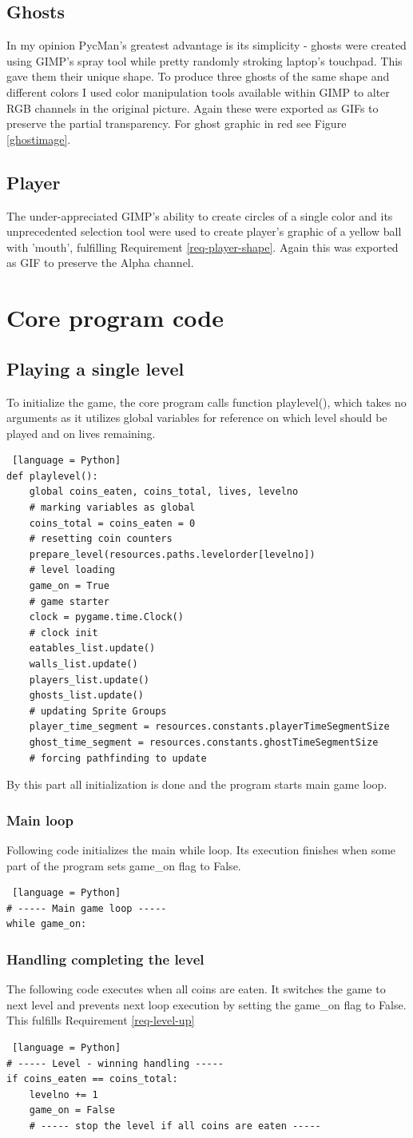 \documentclass[11pt,a4paper]{report}
\newcommand{\dsubsection}[1]{\FloatBarrier \subsection{#1}}
\begin{document}
			\dsubsection{Ghosts}
				In my opinion PycMan's greatest advantage is its simplicity - ghosts were created using GIMP's spray tool while pretty randomly stroking laptop's touchpad. This gave them their unique shape. To produce three ghosts of the same shape and different colors I used color manipulation tools available within GIMP to alter RGB channels in the original picture. Again these were exported as GIFs to preserve the partial transparency. For ghost graphic in red see Figure \ref{ghostimage}.
			\dsubsection{Player}
				The under-appreciated GIMP's ability to create circles of a single color and its unprecedented selection tool were used to create player's graphic of a yellow ball with 'mouth', fulfilling Requirement \ref{req-player-shape}. Again this was exported as GIF to preserve the Alpha channel.
		\section{Core program code}
			\dsubsection{Playing a single level}
				To initialize the game, the core program calls function playlevel(), which takes no arguments as it utilizes global variables for reference on which level should be played and on lives remaining.
				\begin{lstlisting} [language = Python]
def playlevel():
	global coins_eaten, coins_total, lives, levelno
	# marking variables as global
	coins_total = coins_eaten = 0
	# resetting coin counters
	prepare_level(resources.paths.levelorder[levelno])
	# level loading
	game_on = True
	# game starter
	clock = pygame.time.Clock()
	# clock init
	eatables_list.update()
	walls_list.update()
	players_list.update()
	ghosts_list.update()
	# updating Sprite Groups
	player_time_segment = resources.constants.playerTimeSegmentSize
	ghost_time_segment = resources.constants.ghostTimeSegmentSize
	# forcing pathfinding to update
				\end{lstlisting}
				By this part all initialization is done and the program starts main game loop.
				\subsubsection{Main loop}
					Following code initializes the main while loop. Its execution finishes when some part of the program sets game\_on flag to False.
					\begin{lstlisting} [language = Python]
# ----- Main game loop -----
while game_on:
					\end{lstlisting}
				\subsubsection{Handling completing the level}
					The following code executes when all coins are eaten. It switches the game to next level and prevents next loop execution by setting the game\_on flag to False. This fulfills Requirement \ref{req-level-up}
					\begin{lstlisting} [language = Python]
# ----- Level - winning handling -----
if coins_eaten == coins_total:
	levelno += 1
	game_on = False
	# ----- stop the level if all coins are eaten -----
					\end{lstlisting}
\end{document}
